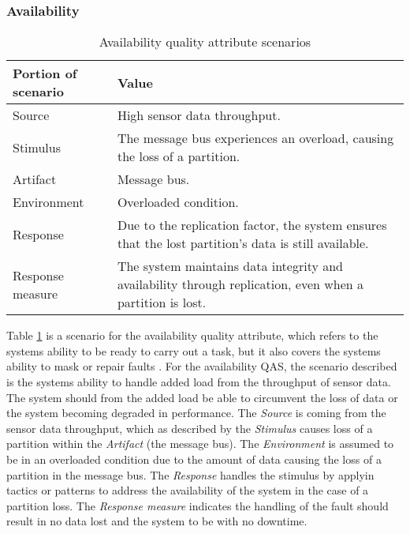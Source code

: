 \subsubsection{Availability}

\begin{table}[h]
    \renewcommand{\arraystretch}{1.3}
    \caption{Availability quality attribute scenarios}
    \label{availability}
    \centering
    \begin{tabularx}{\columnwidth}{>{\hsize=0.3\hsize}X>{\hsize=0.7\hsize}X}
        \hline
        \textbf{Portion of scenario} & \textbf{Value}                                                                                           \\
        \hline
        Source                       & High sensor data throughput.                                                                             \\
        Stimulus                     & The message bus experiences an overload, causing the loss of a partition.                                \\
        Artifact                     & Message bus.                                                                                             \\
        Environment                  & Overloaded condition.                                                                                    \\
        Response                     & Due to the replication factor, the system ensures that the lost partition's data is still available.     \\
        Response measure             & The system maintains data integrity and availability through replication, even when a partition is lost. \\
        \hline
    \end{tabularx}
\end{table}

Table \ref{availability} is a scenario for the availability quality attribute, which refers to the systems ability to be ready to carry out a task, but it also covers the systems ability to mask or repair faults \cite{bass2021software}.
For the availability QAS, the scenario described is the systems ability to handle added load from the throughput of sensor data. The system should from the added load be able to circumvent the loss of data or the system becoming degraded in performance.
The \textit{Source} is coming from the sensor data throughput, which as described by the \textit{Stimulus} causes loss of a partition within the \textit{Artifact} (the message bus). The \textit{Environment} is assumed to be in an overloaded condition due to the amount of data causing the loss of a partition in the message bus.
The \textit{Response} handles the stimulus by applyin tactics or patterns to address the availability of the system in the case of a partition loss. The \textit{Response measure} indicates the handling of the fault should result in no data lost and the system to be with no downtime. \newline
